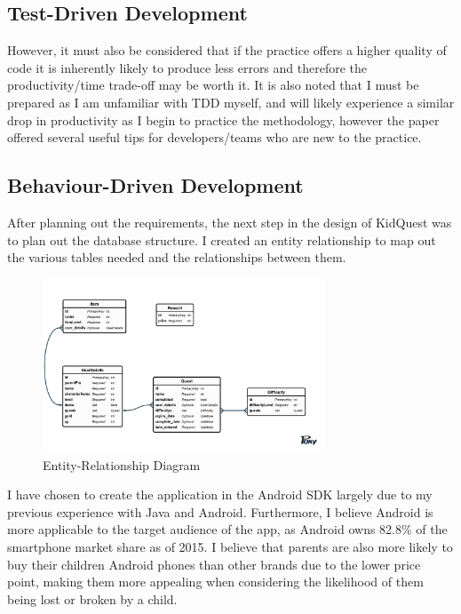 \subsection{Test-Driven Development}

However, it must also be considered that if the practice offers a higher quality of code it is inherently likely to produce less errors and therefore the productivity/time trade-off may be worth it.
It is also noted that I must be prepared as I am unfamiliar with TDD myself, and will likely experience a similar drop in productivity as I begin to practice the methodology, however the paper offered several useful tips for developers/teams who are new to the practice.

\subsection{Behaviour-Driven Development}
After planning out the requirements, the next step in the design of KidQuest was to plan out the database structure.
I created an entity relationship to map out the various tables needed and the relationships between them.

\begin{figure}[t]
	\centering
	\includegraphics[width=0.75\textwidth]{images/entityRelationshipDiagram.png}
	\caption{Entity-Relationship Diagram}
	\label{fig:ERD}
\end{figure}

I have chosen to create the application in the Android SDK largely due to my previous experience with Java and Android. 
Furthermore, I believe Android is more applicable to the target audience of the app, as Android owns 82.8\% of the smartphone market share as of 2015.
I believe that parents are also more likely to buy their children Android phones than other brands due to the lower price point, making them more appealing when considering the likelihood of them being lost or broken by a child.

